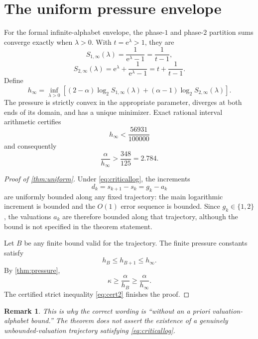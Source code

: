 \documentclass[11pt]{amsart}
\newtheorem{remark}[theorem]{Remark}
\newcommand{\e}{\mathrm e}
\begin{document}
\section{The uniform pressure envelope}\label{sec:uniform-envelope}

For the formal infinite-alphabet envelope, the phase-\(1\) and phase-\(2\) partition sums converge exactly when \(\lambda>0\).  With \(t=\e^\lambda>1\), they are
\begin{equation}\label{eq:infsums}
 S_{1,\infty}(\lambda)
 =\frac1{\e^\lambda-1}=\frac1{t-1},
\end{equation}
\begin{equation}\label{eq:infsums2}
 S_{2,\infty}(\lambda)
 =\e^\lambda+\frac1{\e^\lambda-1}
 =t+\frac1{t-1}.
\end{equation}
Define
\begin{equation}\label{eq:hinfty}
 h_\infty
 =\inf_{\lambda>0}
 \left[
 (2-\alpha)\log_2S_{1,\infty}(\lambda)
 +(\alpha-1)\log_2S_{2,\infty}(\lambda)
 \right].
\end{equation}
The pressure is strictly convex in the appropriate parameter, diverges at both ends of its domain, and has a unique minimizer.  Exact rational interval arithmetic certifies
\begin{equation}\label{eq:cert}
 h_\infty<\frac{56931}{100000}
\end{equation}
and consequently
\begin{equation}\label{eq:cert2}
 \frac{\alpha}{h_\infty}>
 \frac{348}{125}=2.784.
\end{equation}

\begin{proof}[Proof of \cref{thm:uniform}]
Under \eqref{eq:criticallog}, the increments
\[
 d_k=s_{k+1}-s_k=g_k-a_k
\]
are uniformly bounded along any fixed trajectory: the main logarithmic increment is bounded and the \(O(1)\) error sequence is bounded.  Since \(g_k\in\{1,2\}\), the valuations \(a_k\) are therefore bounded along that trajectory, although the bound is not specified in the theorem statement.

Let \(B\) be any finite bound valid for the trajectory.  The finite pressure constants satisfy
\[
 h_B\le h_{B+1}\le h_\infty.
\]
By \cref{thm:pressure},
\[
 \kappa\ge\frac{\alpha}{h_B}
 \ge\frac{\alpha}{h_\infty}.
\]
The certified strict inequality \eqref{eq:cert2} finishes the proof.
\end{proof}

\begin{remark}
This is why the correct wording is ``without an a priori valuation-alphabet bound.''  The theorem does not assert the existence of a genuinely unbounded-valuation trajectory satisfying \eqref{eq:criticallog}.
\end{remark}
\end{document}

